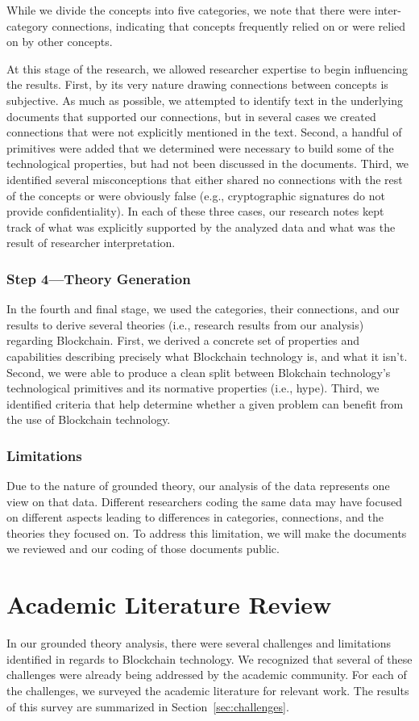 While we divide the concepts into five categories, we note that there were inter-category connections, indicating that concepts frequently relied on or were relied on by other concepts.

At this stage of the research, we allowed researcher expertise to begin influencing the results.
First, by its very nature drawing connections between concepts is subjective.
As much as possible, we attempted to identify text in the underlying documents that supported our connections, but in several cases we created connections that were not explicitly mentioned in the text.
Second, a handful of primitives were added that we determined were necessary to build some of the technological properties, but had not been discussed in the documents.
Third, we identified several misconceptions that either shared no connections with the rest of the concepts or were obviously false (e.g., cryptographic signatures do not provide confidentiality).
In each of these three cases, our research notes kept track of what was explicitly supported by the analyzed data and what was the result of researcher interpretation.

\subsubsection{Step 4---Theory Generation}
In the fourth and final stage, we used the categories, their connections, and our results to derive several theories (i.e., research results from our analysis) regarding Blockchain.
First, we derived a concrete set of properties and capabilities describing precisely what Blockchain technology is, and what it isn't.
Second, we were able to produce a clean split between Blokchain technology's technological primitives and its normative properties (i.e., hype).
Third, we identified criteria that help determine whether a given problem can benefit from the use of Blockchain technology.

\subsubsection{Limitations}
Due to the nature of grounded theory, our analysis of the data represents one view on that data.
Different researchers coding the same data may have focused on different aspects leading to differences in categories, connections, and the theories they focused on.
To address this limitation, we will make the documents we reviewed and our coding of those documents public.

\section{Academic Literature Review}
In our grounded theory analysis, there were several challenges and limitations identified in regards to Blockchain technology.
We recognized that several of these challenges were already being addressed by the academic community.
For each of the challenges, we surveyed the academic literature for relevant work.
The results of this survey are summarized in Section~\ref{sec:challenges}.